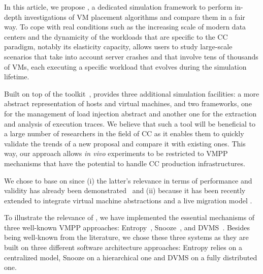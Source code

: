 In this article, we propose \vmps, a dedicated simulation framework to
perform in-depth investigations of VM placement algorithms and compare
them in a fair way. To cope with real conditions such as the
increasing scale of modern data centers and the dynamicity of the
workloads that are specific to the CC paradigm, notably its elasticity
capacity, \vmps allows users to study large-scale scenarios that take
into account server crashes and that involve tens of thousands of VMs,
each executing a specific workload that evolves during the
simulation lifetime.

Built on top of the \sg toolkit~\cite{casanova:hal-01017319}, \vmps
provides three additional simulation facilities: a more abstract
representation of hosts and virtual machines, and two frameworks, one
for the management of load injection abstract and another one for the
extraction and analysis of execution traces. We believe that such a
tool will be beneficial to a large number of researchers in the field
of CC as it enables them to quickly validate
the trends of a new proposal and compare it with existing
ones. This way, our approach allows \textit{in vivo} experiments to be
restricted to VMPP mechanisms that have the potential to handle CC
production infrastructures.

%
We chose to base \vmps on \sg since (i) the latter's relevance in
terms of performance and validity has already been
demonstrated~\cite{simgridpub} and (ii) because it has been recently
extended to integrate virtual machine abstractions and a live
migration model \cite{Hirofuchi:2013:ALM:2568486.2568524}.

To illustrate the relevance of \vmps, we have implemented the
essential mechanisms of three well-known VMPP approaches:
Entropy~\cite{Hermenier:2009:ECM:1508293.1508300},
Snooze~\cite{feller:ccgrid12}, and DVMS~\cite{quesnel:cpe2012}.
Besides being well-known from the literature, we chose
these three systems as they are built on three different software
architecture approaches: Entropy relies on a centralized model, Snooze
on a hierarchical one and DVMS on a fully distributed one.

